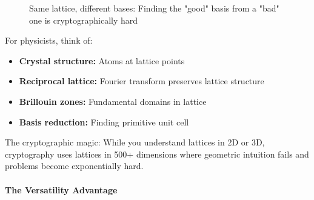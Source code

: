 \documentclass[11pt,a4paper]{article}
\begin{document}
\begin{figure}[h]
\centering
{}
\caption{Same lattice, different bases: Finding the "good" basis from a "bad" one is cryptographically hard}
\end{figure}

For physicists, think of:
\begin{itemize}
    \item \textbf{Crystal structure:} Atoms at lattice points
    \item \textbf{Reciprocal lattice:} Fourier transform preserves lattice structure
    \item \textbf{Brillouin zones:} Fundamental domains in lattice
    \item \textbf{Basis reduction:} Finding primitive unit cell
\end{itemize}

The cryptographic magic: While you understand lattices in 2D or 3D, cryptography uses lattices in 500+ dimensions where geometric intuition fails and problems become exponentially hard.

\paragraph{The Versatility Advantage}
\end{document}
